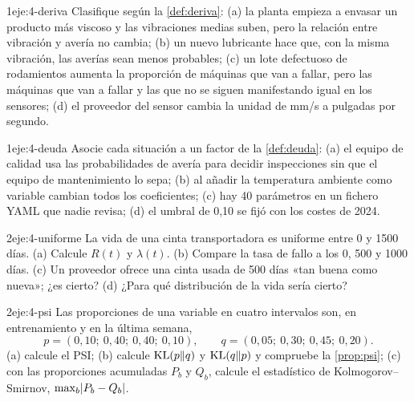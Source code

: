 \begin{ejercicio}{1}{eje:4-deriva}
Clasifique según la \cref{def:deriva}: (a) la planta empieza a envasar un producto más viscoso y las vibraciones medias suben, pero la relación entre vibración y avería no cambia; (b) un nuevo lubricante hace que, con la misma vibración, las averías sean menos probables; (c) un lote defectuoso de rodamientos aumenta la proporción de máquinas que van a fallar, pero las máquinas que van a fallar y las que no se siguen manifestando igual en los sensores; (d) el proveedor del sensor cambia la unidad de mm/s a pulgadas por segundo.
\end{ejercicio}

\begin{ejercicio}{1}{eje:4-deuda}
Asocie cada situación a un factor de la \cref{def:deuda}: (a) el equipo de calidad usa las probabilidades de avería para decidir inspecciones sin que el equipo de mantenimiento lo sepa; (b) al añadir la temperatura ambiente como variable cambian todos los coeficientes; (c) hay 40 parámetros en un fichero YAML que nadie revisa; (d) el umbral de 0{,}10 se fijó con los costes de 2024.
\end{ejercicio}

\begin{ejercicio}{2}{eje:4-uniforme}
La vida de una cinta transportadora es uniforme entre 0 y 1500 días. (a) Calcule $R(t)$ y $\lambda(t)$. (b) Compare la tasa de fallo a los 0, 500 y 1000 días. (c) Un proveedor ofrece una cinta usada de 500 días «tan buena como nueva»; ¿es cierto? (d) ¿Para qué distribución de la vida sería cierto?
\end{ejercicio}

\begin{ejercicio}{2}{eje:4-psi}
Las proporciones de una variable en cuatro intervalos son, en entrenamiento y en la última semana,
\[
p=(0{,}10;\ 0{,}40;\ 0{,}40;\ 0{,}10),\qquad q=(0{,}05;\ 0{,}30;\ 0{,}45;\ 0{,}20).
\] (a) calcule el PSI; (b) calcule $\operatorname{KL}(p\|q)$ y $\operatorname{KL}(q\|p)$ y compruebe la \cref{prop:psi}; (c) con las proporciones acumuladas $P_b$ y $Q_b$, calcule el estadístico de Kolmogorov--Smirnov, $\max_b\lvert P_b-Q_b\rvert$.
\end{ejercicio}

